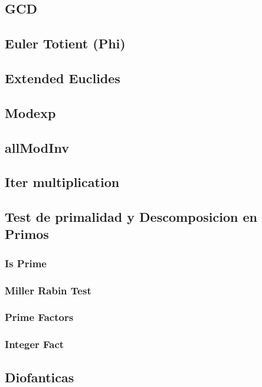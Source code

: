 \subsection{GCD}
\subsection{Euler Totient (Phi)}
\subsection{Extended Euclides}
\subsection{Modexp}
\subsection{allModInv}
\subsection{Iter multiplication}

\subsection{Test de primalidad y Descomposicion en Primos}
\subsubsection{Is Prime}
\subsubsection{Miller Rabin Test}
\subsubsection{Prime Factors}
\subsubsection{Integer Fact}


\subsection{Diofanticas}

